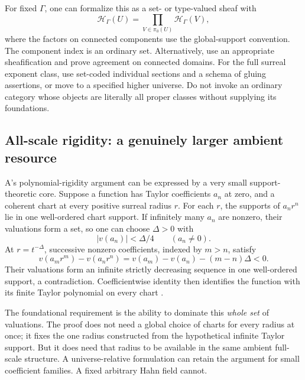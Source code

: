 \documentclass[11pt,letterpaper]{article}
\numberwithin{equation}{section}
\theoremstyle{definition}
\theoremstyle{remark}
\newcommand{\HH}{\mathcal H}
\begin{document}
For fixed $\Gamma$, one can formalize this as a set- or type-valued sheaf with
\[
\HH_\Gamma(U)=\prod_{V\in\pi_0(U)}\HH_\Gamma(V),
\]
where the factors on connected components use the global-support convention. The component index is an ordinary set. Alternatively, use an appropriate sheafification and prove agreement on connected domains. For the full surreal exponent class, use set-coded individual sections and a schema of gluing assertions, or move to a specified higher universe. Do not invoke an ordinary category whose objects are literally all proper classes without supplying its foundations.

\subsection{All-scale rigidity: a genuinely larger ambient resource}
A's polynomial-rigidity argument can be expressed by a very small support-theoretic core. Suppose a function has Taylor coefficients $a_n$ at zero, and a coherent chart at every positive surreal radius $r$. For each $r$, the supports of $a_nr^n$ lie in one well-ordered chart support. If infinitely many $a_n$ are nonzero, their valuations form a set, so one can choose $\Delta>0$ with
\[
|v(a_n)|<\Delta/4\qquad(a_n\ne0).
\]
At $r=t^{-\Delta}$, successive nonzero coefficients, indexed by $m>n$, satisfy
\[
v(a_mr^m)-v(a_nr^n)
=v(a_m)-v(a_n)-(m-n)\Delta<0.
\]
Their valuations form an infinite strictly decreasing sequence in one well-ordered support, a contradiction. Coefficientwise identity then identifies the function with its finite Taylor polynomial on every chart \cite{SourceA}.

The foundational requirement is the ability to dominate this \emph{whole set} of valuations. The proof does not need a global choice of charts for every radius at once; it fixes the one radius constructed from the hypothetical infinite Taylor support. But it does need that radius to be available in the same ambient full-scale structure. A universe-relative formulation can retain the argument for small coefficient families. A fixed arbitrary Hahn field cannot.
\end{document}
